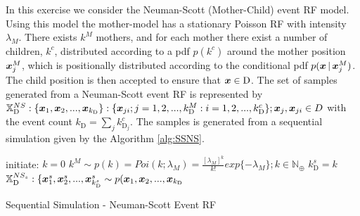 \section{}
\label{sec:problem3}
In this exercise we consider the Neuman-Scott (Mother-Child) event RF model. Using this model the mother-model has a stationary Poisson RF with intensity $\lambda_M$. There exists $k^M$ mothers, and for each mother there exist a number of children, $k^c$, distributed according to a pdf $p(k^c)$ around the mother position $\bm{x}_j^M$, which is positionally distributed according to the conditional pdf $p(\bm{x} \, | \, \bm{x}_j^M)$. The child position is then accepted to ensure that $\bm{x} \in \textrm{D}$. The set of samples generated from a Neuman-Scott event RF  is represented by
$\mathbb{X}_\textrm{D}^{NS}:\{\bm{x}_1,\bm{x}_2,...,\bm{x}_{k_\textrm{D}}\}:\{\bm{x}_{ji};j=1,2,...,k_\textrm{D}^M:i = 1,2,...,k_\textrm{D}^c\};\bm{x}_j,\bm{x}_{ji}\in D$ with the event count $k_\textrm{D} = \sum_j k_{\textrm{D}_j}^c$. The samples is generated from a sequential simulation given by the Algorithm \ref{alg:SSNS}.

\begin{algorithm}[H]
\SetAlgoLined
initiate:\;
$k = 0$\;
$k^M \sim p(k) = Poi(k;\lambda_M) = \frac{[\lambda_M]^k}{k!}exp\{-\lambda_M\};k\in\mathbb{N}_\oplus$\;
$k_\textrm{D}^s = k$\;
$\mathbb{X}_\textrm{D}^{NS_s}:\{\bm{x}_1^s,\bm{x}_2^s,...,\bm{x}_{k_\textrm{D}^s}^s \sim p(\bm{x}_1,\bm{x}_2,...,\bm{x}_{k_\textrm{D}}$\;
 \caption{Sequential Simulation - Neuman-Scott Event RF}
 \label{alg:SSNS}
\end{algorithm}

